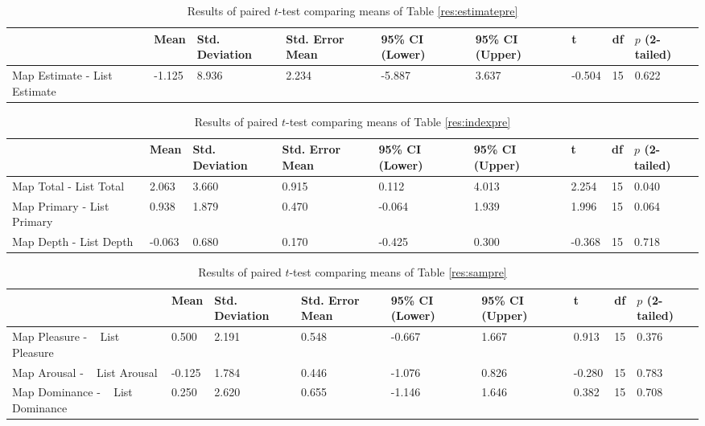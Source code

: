\begin{landscape}
\begin{table}[hbtp!]
\centering
\caption{Results of paired $t$-test comparing means of Table \ref{res:estimatepre}}\vspace{0.3cm}
\label{res:estimate}
\begin{tabular}{|m{3cm}|llllllll|}
\hline
& Mean & Std. Deviation & Std. Error Mean & 95\% CI (Lower) & 95\% CI (Upper) & t & df & $p$ (2-tailed) \\ \hline\hline
Map Estimate - \newline List Estimate & -1.125 & 8.936          & 2.234           & -5.887                         & 3.637                         & -0.504 & 15 & 0.622           \\ \hline
\end{tabular}
\end{table}


\begin{table}[hbtp!]
\centering
\caption{Results of paired $t$-test comparing means of Table \ref{res:indexpre}}\vspace{0.3cm}
\label{res:index}
\begin{tabular}{|m{3cm}|llllllll|}
\hline
& Mean & Std. Deviation & Std. Error Mean & 95\% CI (Lower) & 95\% CI (Upper) & t & df & $p$ (2-tailed) \\ \hline\hline
Map Total - List Total & 2.063  & 3.660 & 0.915 & 0.112  & 4.013 & 2.254  & 15 & 0.040 \\ \hline
Map Primary - List Primary & 0.938  & 1.879 & 0.470 & -0.064 & 1.939 & 1.996  & 15 & 0.064 \\ \hline
Map Depth - List Depth & -0.063 & 0.680 & 0.170 & -0.425 & 0.300 & -0.368 & 15 & 0.718 \\ \hline
\end{tabular}
\end{table}


\begin{table}[hbtp!]
\centering
\caption{Results of paired $t$-test comparing means of Table \ref{res:sampre}}\vspace{0.3cm}
\label{res:sam}
\begin{tabular}{|m{3cm}|llllllll|}
\hline
& Mean & Std. Deviation & Std. Error Mean & 95\% CI (Lower) & 95\% CI (Upper) & t & df & $p$ (2-tailed) \\ \hline\hline
Map Pleasure - ~ List Pleasure & 0.500  & 2.191 & 0.548 & -0.667 & 1.667 & 0.913  & 15 & 0.376 \\ \hline
Map Arousal - ~ List Arousal & -0.125 & 1.784 & 0.446 & -1.076 & 0.826 & -0.280 & 15 & 0.783 \\\hline
Map Dominance - ~ List Dominance & 0.250  & 2.620 & 0.655 & -1.146 & 1.646 & 0.382  & 15 & 0.708 \\ \hline
\end{tabular}
\end{table}


\end{landscape}
